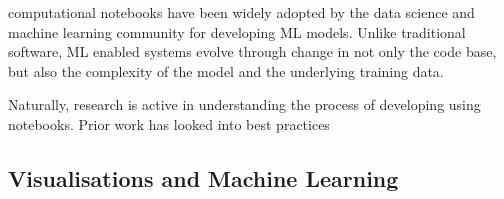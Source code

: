 \documentclass[acmsmall,screen,review,anonymous]{acmart}
\begin{document}

computational notebooks have been widely adopted by the data science and machine learning community for developing ML models. Unlike traditional software, ML enabled systems evolve through change in not only the code base, but also the complexity of the model and the underlying training data.

Naturally, research is active in understanding the process of developing using notebooks. Prior work has looked into best practices
\subsection{Visualisations and Machine Learning}\label{sec:visualisations}





\end{document}
